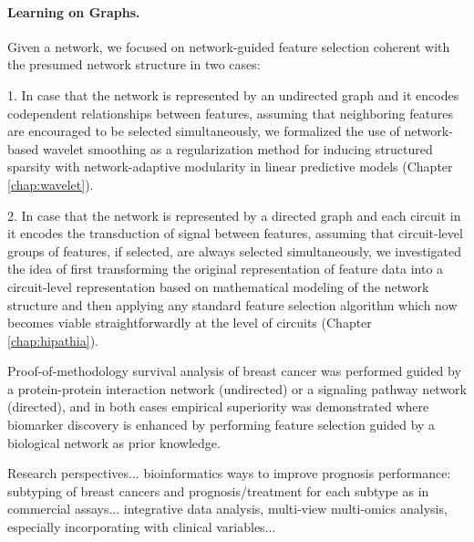 \paragraph{Learning on Graphs.}

Given a network, we focused on network-guided feature selection coherent with the presumed network structure in two cases:
\begin{bulletList}
\item[1.] In case that the network is represented by an undirected graph and it encodes codependent relationships between features, assuming that neighboring features are encouraged to be selected simultaneously, we formalized the use of network-based wavelet smoothing as a regularization method for inducing structured sparsity with network-adaptive modularity in linear predictive models (Chapter \ref{chap:wavelet}).
\item[2.] In case that the network is represented by a directed graph and each circuit in it encodes the transduction of signal between features, assuming that circuit-level groups of features, if selected, are always selected simultaneously, we investigated the idea of first transforming the original representation of feature data into a circuit-level representation based on mathematical modeling of the network structure and then applying any standard feature selection algorithm which now becomes viable straightforwardly at the level of circuits (Chapter \ref{chap:hipathia}).
\end{bulletList}
Proof-of-methodology survival analysis of breast cancer was performed guided by a protein-protein interaction network (undirected) or a signaling pathway network (directed), and in both cases empirical superiority was demonstrated where biomarker discovery is enhanced by performing feature selection guided by a biological network as prior knowledge.



Research perspectives... bioinformatics ways to improve prognosis performance: subtyping of breast cancers and prognosis/treatment for each subtype as in commercial assays... integrative data analysis, multi-view multi-omics analysis, especially incorporating with clinical variables...


